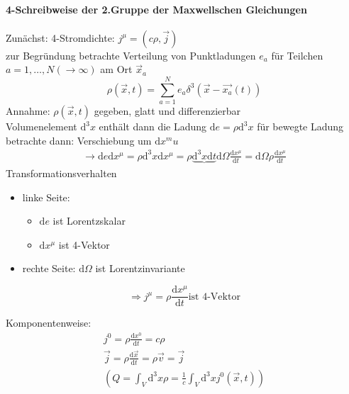 \documentclass[a4paper]{article}
\begin{document}
\paragraph{4-Schreibweise der 2.Gruppe der Maxwellschen Gleichungen}
Zunächst: 4-Stromdichte: $j^\mu=(c\rho,\vec{j})$\\
zur Begründung betrachte Verteilung von Punktladungen $e_a$ für Teilchen 
$a=1,\ldots,N(\rightarrow \infty)$ am Ort $\vec{x}_a$
\begin{equation}
\rho(\vec{x},t)=\sum_{a=1}^N e_a\delta^3(\vec{x}-\vec{x_a}(t))
\end{equation}
Annahme: $\rho(\vec{x},t)$ gegeben, glatt und differenzierbar\\
Volumenelement $\mathrm{d}^3x$ enthält dann die Ladung $\mathrm{d}e=\rho \mathrm{d}^3x$
für bewegte Ladung betrachte dann: Verschiebung um $\mathrm{d}x^mu$
\begin{align}
\rightarrow \mathrm{d}e \mathrm{d}x^\mu=\rho \mathrm{d}^3x \mathrm{d}x^\mu=\rho
\underbrace{\mathrm{d}^3x\mathrm{d}t}{\mathrm{d}\Omega}\frac{\mathrm{d}x^\mu}{\mathrm{d}t}
=\mathrm{d}\Omega \rho \frac{\mathrm{d} x^\mu}{\mathrm{d}t}
\end{align}
Transformationsverhalten
\begin{itemize}
  \item linke Seite:
	\begin{itemize}
  		\item $\mathrm{d}e$ ist Lorentzskalar
  		\item $\mathrm{d}x^\mu$ ist 4-Vektor 
	\end{itemize}
  \item rechte Seite: $\mathrm{d}\Omega$ ist Lorentzinvariante
\end{itemize}
\begin{equation}
\Rightarrow j^\mu=\rho\frac{\mathrm{d}x^\mu}{\mathrm{d}t} \text{ist 4-Vektor}
\end{equation}

Komponentenweise:
\begin{align}
j^0=\rho \frac{\mathrm{d}x^0}{\mathrm{d}t}=c\rho\\
\vec{j}=\rho\frac{\mathrm{d}\vec{x}}{\mathrm{d}t}=\rho\vec{v}=\vec{j}\\
\left( Q=\int_V \mathrm{d}^3x\rho=\frac{1}{c}\int_V \mathrm{d}^3xj^0(\vec{x},t) \right)
\end{align}
\end{document}
